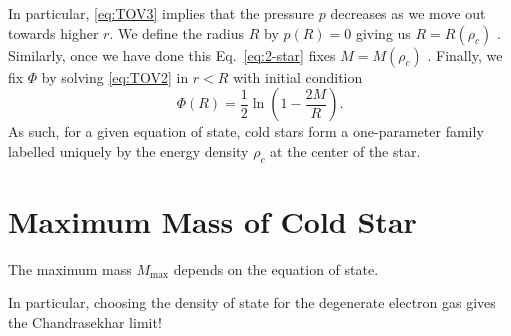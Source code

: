 In particular, \eqref{eq:TOV3} implies that the pressure  $p$  decreases as we move out towards higher $r$.
We define the radius  $R$  by $p(R) = 0$  giving us $R = R(\rho_c)$ . Similarly, once we have done this Eq.~\eqref{eq:2-star} fixes $M = M(\rho_c)$ . Finally, we fix $\Phi$ by solving  \eqref{eq:TOV2} in $r < R$ with initial condition
 \begin{equation}
  \Phi(R) = \frac{1}{2} \ln(1 - \frac{2M}{R}).
\end{equation}
As such, for a given equation of state, cold stars form a one-parameter family labelled uniquely by the energy density $\rho_c$ at the center of the star.

\section{Maximum Mass of Cold Star}%
\label{sec:maximum_mass_of_cold_star}

The maximum mass $M_{\text{max}}$  depends on the equation of state.
\begin{leftbar}
  In particular, choosing the density of state for the degenerate electron gas gives the Chandrasekhar limit!
\end{leftbar}
\begin{figure}[tbhp]
  \centering
  \def\svgwidth{0.4\columnwidth}
  
  \caption{}
  \label{fig:l2f1}
\end{figure}

